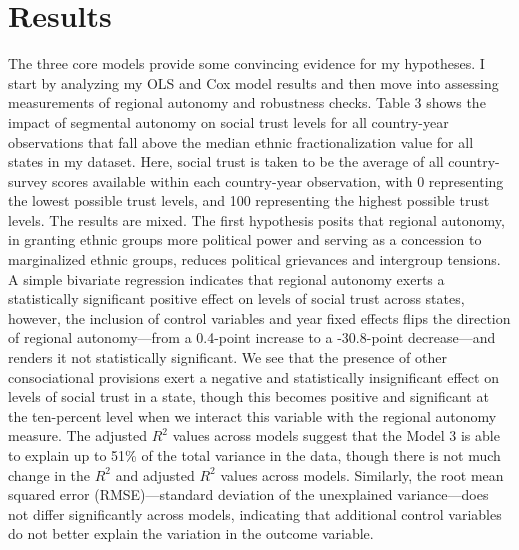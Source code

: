 \documentclass[12pt]{article}
\begin{document}
\section{Results}
The three core models provide some convincing evidence for my hypotheses. I start by analyzing my OLS and Cox model results and then move into assessing measurements of regional autonomy and robustness checks. Table 3 shows the impact of segmental autonomy on social trust levels for all country-year observations that fall above the median ethnic fractionalization value for all states in my dataset. Here, social trust is taken to be the average of all country-survey scores available within each country-year observation, with 0 representing the lowest possible trust levels, and 100 representing the highest possible trust levels. The results are mixed. The first hypothesis posits that regional autonomy, in granting ethnic groups more political power and serving as a concession to marginalized ethnic groups, reduces political grievances and intergroup tensions. A simple bivariate regression indicates that regional autonomy exerts a statistically significant positive effect on levels of social trust across states, however, the inclusion of control variables and year fixed effects flips the direction of regional autonomy---from a 0.4-point increase to a -30.8-point decrease---and renders it not statistically significant. We see that the presence of other consociational provisions exert a negative and statistically insignificant effect on levels of social trust in a state, though this becomes positive and significant at the ten-percent level when we interact this variable with the regional autonomy measure. The adjusted $R^2$ values across models suggest that the Model 3 is able to explain up to 51\% of the total variance in the data, though there is not much change in the $R^2$ and adjusted $R^2$ values across models. Similarly, the root mean squared error (RMSE)---standard deviation of the unexplained variance---does not differ significantly across models, indicating that additional control variables do not better explain the variation in the outcome variable.  
\end{document}
